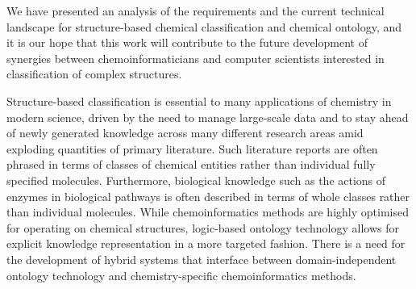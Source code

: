 \documentclass[10pt]{bmc_article}
\newenvironment{bmcformat}{\baselineskip20pt\sloppy\setboolean{publ}{false}}{\baselineskip20pt\sloppy}
\begin{document}
\begin{bmcformat}

We have presented an analysis of the requirements and the current technical landscape for structure-based chemical classification and chemical ontology, and it is our hope that this work will contribute to the future development of synergies between chemoinformaticians and computer scientists interested in classification of complex structures. 

Structure-based classification is essential to many applications of chemistry in modern science, driven by the need to manage large-scale data and to stay ahead of newly generated knowledge across many different research areas amid exploding quantities of primary literature. Such literature reports are often phrased in terms of classes of chemical entities rather than individual fully specified molecules. Furthermore, biological knowledge such as the actions of enzymes in biological pathways is often described in terms of whole classes rather than individual molecules. While chemoinformatics methods are highly optimised for operating on chemical structures, logic-based ontology technology allows for explicit knowledge representation in a more targeted fashion. There is a need for the development of hybrid systems that interface between domain-independent ontology technology and chemistry-specific chemoinformatics methods. 


\end{bmcformat}
\end{document}
